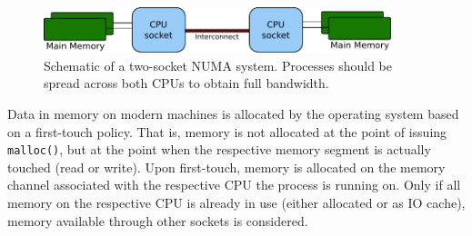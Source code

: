 {{\begin{figure}[tb]
\centerline{ \includegraphics[width=0.9\textwidth]{numa}}
\caption{Schematic of a two-socket NUMA system. Processes should be spread across both CPUs to obtain full bandwidth.}
\label{fig_numa}
\end{figure}

Data in memory on modern machines is allocated by the operating system based on a first-touch policy.
That is, memory is not allocated at the point of issuing \lstinline|malloc()|, but at the point when the respective memory segment is actually touched (read or write).
Upon first-touch, memory is allocated on the memory channel associated with the respective CPU the process is running on.
Only if all memory on the respective CPU is already in use (either allocated or as IO cache), memory available through other sockets is considered.

}}
